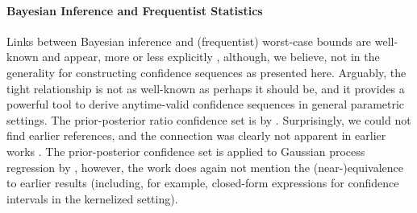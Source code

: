 
\paragraph{Bayesian Inference and Frequentist Statistics} Links between Bayesian inference and (frequentist) worst-case bounds are well-known and appear, more or less explicitly \citep[e.g.,][]{zhang2006varepsilon}, although, we believe, not in the generality for constructing confidence sequences as presented here. Arguably, the tight relationship is not as well-known as perhaps it should be, and it provides a powerful tool to derive anytime-valid confidence sequences in general parametric settings. The prior-posterior ratio confidence set is by \citet{waudby2020confidence}. Surprisingly, we could not find earlier references, and the connection was clearly not apparent in earlier works \citep[e.g.,][]{abbasi2011improved}. The prior-posterior confidence set is applied to Gaussian process regression by \citet{neiswanger2021uncertainty}, however, the work does again not mention the (near-)equivalence to earlier results (including, for example, closed-form expressions for confidence intervals in the kernelized setting).



